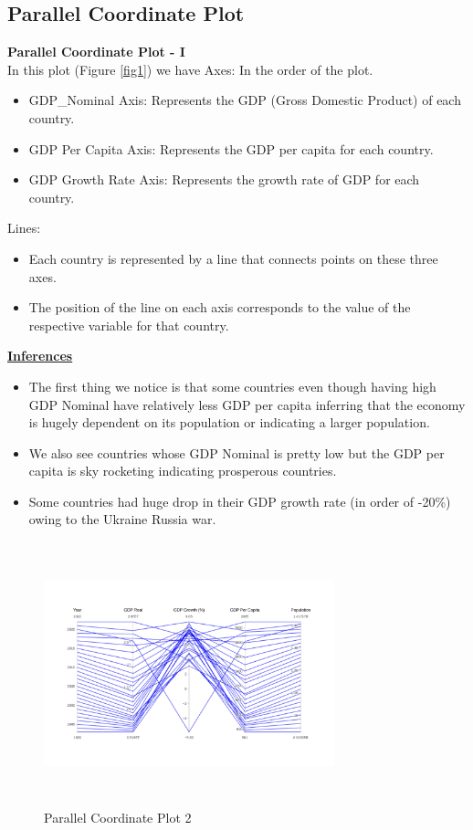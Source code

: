 \documentclass[conference]{IEEEtran}
\begin{document}
\subsection{Parallel Coordinate Plot}
\textbf{Parallel Coordinate Plot - I}\\
In this plot (Figure \ref{fig1}) we have
Axes: In the order of the plot.
\begin{itemize}
    \item GDP\_Nominal Axis: Represents the GDP (Gross Domestic Product) of each country.
    \item GDP Per Capita Axis: Represents the GDP per capita for each country.
    \item GDP Growth Rate Axis: Represents the growth rate of GDP for each country. 
\end{itemize}
Lines:
\begin{itemize}
    \item Each country is represented by a line that connects points on these three axes.
    \item  The position of the line on each axis corresponds to the value of the respective variable for that country.
\end{itemize}
\underline{\textbf{Inferences}}
\begin{itemize}
    \item The first thing we notice is that some countries even though having high GDP Nominal have relatively less GDP per capita inferring that the economy is hugely dependent on its population or indicating a larger population.
    \item We also see countries whose GDP Nominal is pretty low but the  GDP per capita is sky rocketing indicating prosperous countries.
    \item Some countries had huge drop in their GDP growth rate (in order of -20\%) owing to the Ukraine Russia war.
\end{itemize}
\begin{figure}
\centering
    \includegraphics[height=3in, width=0.75\textwidth]{images_ashish/pcp_2.png}
    \caption{Parallel Coordinate Plot 2}
    \label{fig2}
\end{figure}
\end{document}
